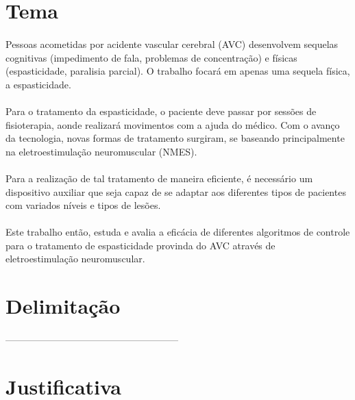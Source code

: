 \section{Tema}

\paragraph{}Pessoas acometidas por acidente vascular cerebral (AVC) desenvolvem sequelas cognitivas (impedimento de fala, problemas de concentração) e físicas (espasticidade, paralisia parcial). O trabalho focará em apenas uma sequela física, a espasticidade.

\paragraph{}Para o tratamento da espasticidade, o paciente deve passar por sessões de fisioterapia, aonde realizará movimentos com a ajuda do médico. Com o avanço da tecnologia, novas formas de tratamento surgiram, se baseando principalmente na eletroestimulação neuromuscular (NMES).

\paragraph{}Para a realização de tal tratamento de maneira eficiente, é necessário um dispositivo auxiliar que seja capaz de se adaptar aos diferentes tipos de pacientes com variados níveis e tipos de lesões.

\paragraph{}Este trabalho então, estuda e avalia a eficácia de diferentes algoritmos de controle para o tratamento de espasticidade provinda do AVC através de eletroestimulação neuromuscular.


\section{Delimitação}

\paragraph{}------------------------------------------------------


\section{Justificativa}

